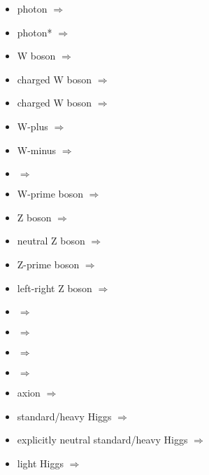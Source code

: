 \begin{multicols}{2}
{\begin{itemize}
\item photon\newline {} $\Rightarrow$ \Pgg
\item photon*\newline {} $\Rightarrow$ \Pggx
\item W boson\newline {} $\Rightarrow$ \PW
\item charged W boson\newline {} $\Rightarrow$ \PWpm
\item charged W boson\newline {} $\Rightarrow$ \PWmp
\item W-plus\newline {} $\Rightarrow$ \PWp
\item W-minus\newline {} $\Rightarrow$ \PWm
\item  {} $\Rightarrow$ \PWR
\item W-prime boson\newline {} $\Rightarrow$ \PWpr
\item Z boson\newline {} $\Rightarrow$ \PZ
\item neutral Z boson\newline {} $\Rightarrow$ \PZz
\item Z-prime boson\newline {} $\Rightarrow$ \PZpr
\item left-right Z boson\newline {} $\Rightarrow$ \PZLR
\item  {} $\Rightarrow$ \PZgc
\item  {} $\Rightarrow$ \PZge
\item  {} $\Rightarrow$ \PZgy
\item  {} $\Rightarrow$ \PZi
\item axion\newline {} $\Rightarrow$ \PAz
\item standard/heavy Higgs\newline {} $\Rightarrow$ \PH
\item explicitly neutral standard/heavy Higgs\newline {} $\Rightarrow$ \PHz
\item light Higgs\newline {} $\Rightarrow$ \Ph

\end{itemize}}
\end{multicols}
